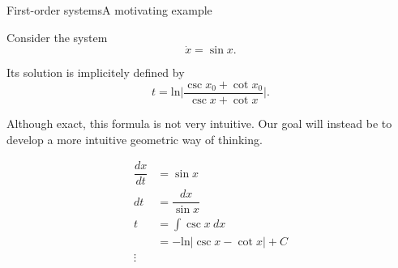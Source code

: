 \documentclass[usenames,dvipsnames,svgnames,10pt,aspectratio=169]{beamer}
\begin{document}
\begin{frame}[t, c]{First-order systems}{A motivating example}
  \begin{minipage}{.58\textwidth}
    Consider the system
    \[ \dot{x} = \sin x. \]


    Its solution is implicitely defined by
    \[
    t = \mathrm{ln} \Big\vert \dfrac{\csc x_0 + \cot x_0}{\csc x + \cot x} \Big\vert.
    \]

    Although exact, this formula is not very intuitive.
    Our goal will instead be to develop a more intuitive geometric way of thinking.
  \end{minipage}%
  \hfill
  \begin{minipage}{.38\textwidth}
    \[
    \begin{aligned}
      \dfrac{dx}{dt} & = \sin x \\
      dt & = \dfrac{dx}{\sin x} \\
      t & = \int \csc x \ dx \\
      & = - \mathrm{ln} \vert \csc x - \cot x \vert + C \\
      \vdots
    \end{aligned}
    \]
  \end{minipage}

  \vspace{1cm}
\end{frame}
\end{document}
